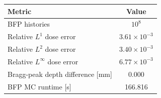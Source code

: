 
\begin{tabular}{lc}
\toprule
Metric & Value \\
\midrule
BFP histories & $10^{8}$ \\
Relative $L^1$ dose error & $3.61\times 10^{-3}$ \\
Relative $L^2$ dose error & $3.40\times 10^{-3}$ \\
Relative $L^\infty$ dose error & $6.77\times 10^{-3}$ \\
Bragg-peak depth difference [mm] & 0.000 \\
BFP MC runtime [s] & 166.816 \\
\bottomrule
\end{tabular}
